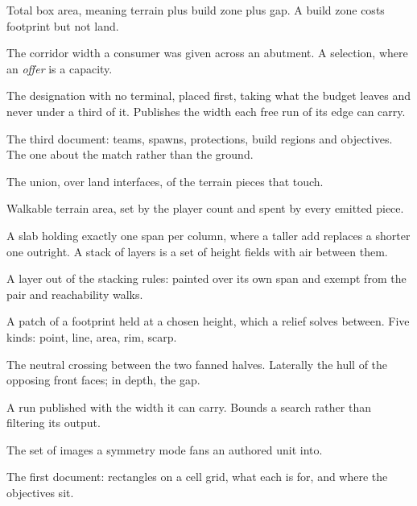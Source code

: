 \begin{description}[leftmargin=0pt,style=nextline,itemsep=3pt,font=\normalfont\sffamily\bfseries]
\item[Footprint] Total box area, meaning terrain plus build zone plus gap. A build
  zone costs footprint but not land.

\item[Grant] The corridor width a consumer was given across an abutment. A
  selection, where an \emph{offer} is a capacity.

\item[Hub] The designation with no terminal, placed first, taking what the budget
  leaves and never under a third of it. Publishes the width each free run of its
  edge can carry.

\item[Intent] The third document: teams, spawns, protections, build regions and
  objectives. The one about the match rather than the ground.

\item[Island] The union, over land interfaces, of the terrain pieces that touch.

\item[Land] Walkable terrain area, set by the player count and spent by every
  emitted piece.

\item[Layer] A slab holding exactly one span per column, where a taller add replaces
  a shorter one outright. A stack of layers is a set of height fields with air
  between them.

\item[Made layer] A layer out of the stacking rules: painted over its own span and
  exempt from the pair and reachability walks.

\item[Mark] A patch of a footprint held at a chosen height, which a relief solves
  between. Five kinds: point, line, area, rim, scarp.

\item[Mid band] The neutral crossing between the two fanned halves. Laterally the
  hull of the opposing front faces; in depth, the gap.

\item[Offer] A run published with the width it can carry. Bounds a search rather
  than filtering its output.

\item[Orbit] The set of images a symmetry mode fans an authored unit into.

\item[Plan] The first document: rectangles on a cell grid, what each is for, and
  where the objectives sit.


\end{description}
